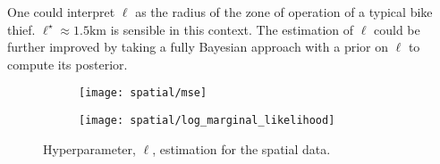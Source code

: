\documentclass[11pt]{article}
\begin{document}
One could interpret $\ell$ as the radius of the zone of operation of a typical bike thief. $\ell^{\star} \approx 1.5\text{km}$ is sensible in this context. The estimation of $\ell$ could be further improved by taking a fully Bayesian approach with a prior on $\ell$ to compute its posterior.

\begin{figure}
    \centering
    \begin{subfigure}{0.45\textwidth}
        \texttt{[image: spatial/mse]}
        \label{fig:spatial_mse}
    \end{subfigure}
    \begin{subfigure}{0.45\textwidth}
        \texttt{[image: spatial/log\_marginal\_likelihood]}
        \label{fig:spatial_marginal_likelihood}
    \end{subfigure}
    \caption{Hyperparameter, $\ell$, estimation for the spatial data.}
\end{figure}



\end{document}
